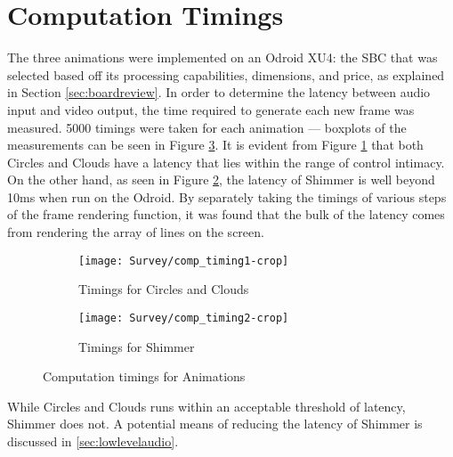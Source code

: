 \documentclass[../initial_thesis.tex]{subfiles}
\begin{document}
\section{Computation Timings} \label{sec:timings}
The three animations were implemented on an Odroid XU4: the SBC that was selected based off its processing capabilities, dimensions, and price, as explained in Section \ref{sec:boardreview}. In order to determine the latency between audio input and video output, the time required to generate each new frame was measured. 5000 timings were taken for each animation --- boxplots of the measurements can be seen in Figure \ref{fig:comp_timings}. It is evident from Figure \ref{fig:timings_circlesclouds} that both Circles and Clouds have a latency that lies within the range of control intimacy. On the other hand, as seen in Figure \ref{fig:timings_shimmer}, the latency of Shimmer is well beyond 10ms when run on the Odroid. By separately taking the timings of various steps of the frame rendering function, it was found that the bulk of the latency comes from rendering the array of lines on the screen.

\begin{figure}
  \begin{subfigure}{0.5\textwidth}
    \centering
    \texttt{[image: Survey/comp\_timing1-crop]}
    \caption{Timings for Circles and Clouds}
    \label{fig:timings_circlesclouds}
  \end{subfigure}
  \begin{subfigure}{0.5\textwidth}
    \centering
    \texttt{[image: Survey/comp\_timing2-crop]}
    \caption{Timings for Shimmer}
    \label{fig:timings_shimmer}
  \end{subfigure}
  \caption{Computation timings for Animations}
  \label{fig:comp_timings}
\end{figure}

While Circles and Clouds runs within an acceptable threshold of latency, Shimmer does not. A potential means of reducing the latency of Shimmer is discussed in \ref{sec:lowlevelaudio}.
\end{document}
